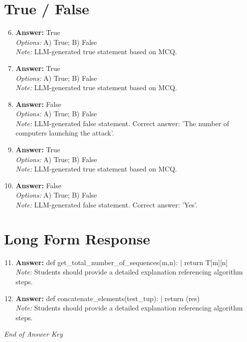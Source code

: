 \documentclass[12pt]{article}
\begin{document}
\section*{True / False}
\begin{enumerate}[label=\arabic*.]
\setcounter{enumi}{5}
\item \textbf{Answer:} True
\\ \textit{Options:} A) True; B) False
\\ \textit{Note:} LLM-generated true statement based on MCQ.
\item \textbf{Answer:} True
\\ \textit{Options:} A) True; B) False
\\ \textit{Note:} LLM-generated true statement based on MCQ.
\item \textbf{Answer:} False
\\ \textit{Options:} A) True; B) False
\\ \textit{Note:} LLM-generated false statement. Correct answer: 'The number of computers launching the attack'.
\item \textbf{Answer:} True
\\ \textit{Options:} A) True; B) False
\\ \textit{Note:} LLM-generated true statement based on MCQ.
\item \textbf{Answer:} False
\\ \textit{Options:} A) True; B) False
\\ \textit{Note:} LLM-generated false statement. Correct answer: 'Yes'.
\end{enumerate}

\section*{Long Form Response}
\begin{enumerate}[label=\arabic*.]
\setcounter{enumi}{10}
\item \textbf{Answer:} def get\_total\_number\_of\_sequences(m,n): | return T[m][n]
\\ \textit{Note:} Students should provide a detailed explanation referencing algorithm steps.
\item \textbf{Answer:} def concatenate\_elements(test\_tup): | return (res)
\\ \textit{Note:} Students should provide a detailed explanation referencing algorithm steps.
\end{enumerate}

\vfill
\noindent\textit{End of Answer Key}
\end{document}

